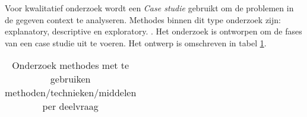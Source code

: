 
Voor kwalitatief onderzoek wordt een \textit{Case studie} gebruikt om de problemen in de gegeven context te analyseren. Methodes binnen dit type onderzoek zijn: explanatory, descriptive en exploratory. \parencite{john-dudovskiy}. Het onderzoek is ontworpen om de fases van een case studie uit te voeren. Het ontwerp is omschreven in tabel \ref{tab:onderzoekmethode}.

\begin{center}
\begin{table}[bh]
\caption{Onderzoek methodes met te gebruiken methoden/technieken/middelen per deelvraag}
\label{tab:onderzoekmethode}
\def\arraystretch{1.5}
\begin{tabular}{|l|p{4cm}|p{2cm}|p{2.5cm}|p{4.5cm}|}


\end{tabular}
\end{table}
\end{center}
